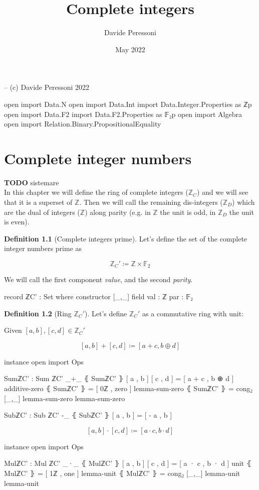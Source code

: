 \documentclass[a4paper]{report}
\title{Complete integers}
\author{Davide Peressoni}
\date{May 2022}
\theoremstyle{definition}
\newtheorem{definition}{Definition}
\theoremstyle{lemma}
\theoremstyle{theorem}
\newcommand\bZ{\mathbb{Z}}
\newcommand\bF{\mathbb{F}}
\begin{document}
\maketitle

\begin{code}
-- (c) Davide Peressoni 2022

open import Data.N
open import Data.Int
import Data.Integer.Properties as ℤp
open import Data.F2
import Data.F2.Properties as 𝔽₂p
open import Algebra
open import Relation.Binary.PropositionalEquality
\end{code}

\chapter{Complete integer numbers}

\textbf{TODO} sistemare\\
In this chapter we will define the ring of complete integers ($\bZ_C$) and we will
see that it is a superset of $\bZ$. Then we will call the remaining dis-integers
($\bZ_D$) which are the dual of integers ($\bZ$) along parity (e.g. in $\bZ$ the unit is
odd, in $\bZ_D$ the unit is even).

\begin{definition}[Complete integers prime]
Let's define the set of the complete integer numbers prime as

\[\bZ_C' \coloneqq \bZ\times\bF_2\]

We will call the first component \emph{value}, and the second \emph{parity}.

\begin{code}
record ℤC' : Set where
  constructor [_,_]
  field
    val : ℤ
    par : 𝔽₂
\end{code}
\end{definition}

\begin{definition}[Ring $\bZ_C'$]
Let's define $\bZ_C'$ as a commutative ring with unit:

Given $[a,b], [c,d] \in \bZ_C'$

\[[a,b] + [c,d] \coloneqq [a+c, b\oplus d]\]

\begin{code}
instance
  open import Ops

  SumℤC' : Sum ℤC'
  _+_ ⦃ SumℤC' ⦄ [ a , b ] [ c , d ] = [ a + c , b ⊕ d ]
  additive-zero ⦃ SumℤC' ⦄ = [ 0ℤ , zero ]
  lemma-sum-zero ⦃ SumℤC' ⦄ = cong₂ [_,_] lemma-sum-zero lemma-sum-zero

  SubℤC' : Sub ℤC'
  -_ ⦃ SubℤC' ⦄ [ a , b ] = [ - a , b ]
\end{code}

\[[a,b] \cdot [c,d] \coloneqq [a\cdot c, b\cdot d]\]

\begin{code}
instance
  open import Ops

  MulℤC' : Mul ℤC'
  _·_ ⦃ MulℤC' ⦄ [ a , b ] [ c , d ] = [ a · c , b · d ]
  unit ⦃ MulℤC' ⦄ = [ 1ℤ , one ]
  lemma-unit ⦃ MulℤC' ⦄ = cong₂ [_,_] lemma-unit lemma-unit
\end{code}
\end{definition}
\end{document}
